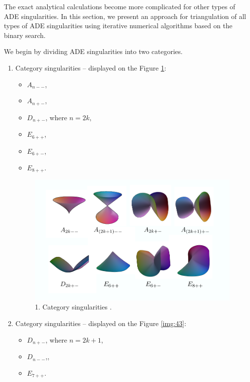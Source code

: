 The exact analytical calculations become more
complicated for other types of ADE singularities. In this section, we present an approach for triangulation of all types
of ADE singularities using iterative numerical algorithms based on the binary 
search.

We begin by dividing ADE singularities into two categories.
\begin{enumerate}
    \item Category singularities -- displayed on the Figure \ref{img:42}:
    \begin{itemize}
        \item $A_{n--}$,
        \item $A_{n+-}$,
        \item $D_{n+-}$, where $n=2k$,
        \item $E_{6++}$, 
        \item $E_{6+-}$,
        \item $E_{8++}$.
    \end{itemize}
    \begin{figure}
        \centerline{\includegraphics[scale=0.5]{images/img42}}
        \caption[1. Category singularities]
        {1. Category singularities \cite{morris2003client}.}
        \label{img:42}
    \end{figure}
    \item Category singularities -- displayed on the Figure \ref{img:43}:
    \begin{itemize}
        \item $D_{n+-}$, where $n=2k+1$,
        \item $D_{n--}$,,
        \item $E_{7++}$.
    \end{itemize}

\end{enumerate}
